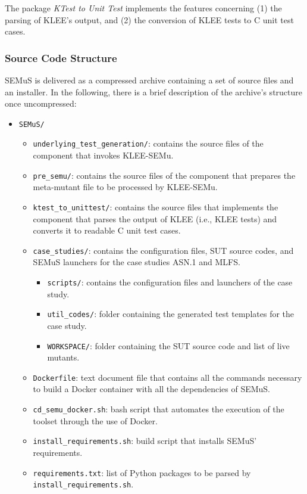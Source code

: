 The package \emph{KTest to Unit Test} implements the features concerning (1) the parsing of KLEE's output, and (2) the conversion of KLEE tests to C unit test cases.

\subsubsection{Source Code Structure}

SEMuS is delivered as a compressed archive containing a set of source files and an installer. In the following, there is a brief description of the archive's structure once uncompressed:

\begin{itemize}
  \item \texttt{SEMuS/}
    \begin{itemize}
      \item \texttt{underlying\_test\_generation/}: contains the source files of the component that invokes KLEE-SEMu.
      \item \texttt{pre\_semu/}: contains the source files of the component that prepares the meta-mutant file to be processed by KLEE-SEMu.
      \item \texttt{ktest\_to\_unittest/}: contains the source files that implements the component that parses the output of KLEE (i.e., KLEE tests) and converts it to readable C unit test cases.
      \item \texttt{case\_studies/}: contains the configuration files, SUT source codes, and SEMuS launchers for the case studies ASN.1 and MLFS.
      \begin{itemize}
        \item \texttt{scripts/}: contains the configuration files and launchers of the case study.
        \item \texttt{util\_codes/}: folder containing the generated test templates for the case study.
        \item \texttt{WORKSPACE/}: folder containing the SUT source code and list of live mutants.
      \end{itemize}
      \item \texttt{Dockerfile}: text document file that contains all the commands necessary to build a Docker container with all the dependencies of SEMuS.
      \item \texttt{cd\_semu\_docker.sh}: bash script that automates the execution of the toolset through the use of Docker.
      \item \texttt{install\_requirements.sh}: build script that installs SEMuS' requirements.
      \item \texttt{requirements.txt}: list of Python packages to be parsed by \texttt{install\_requirements.sh}.
    \end{itemize}
\end{itemize}

